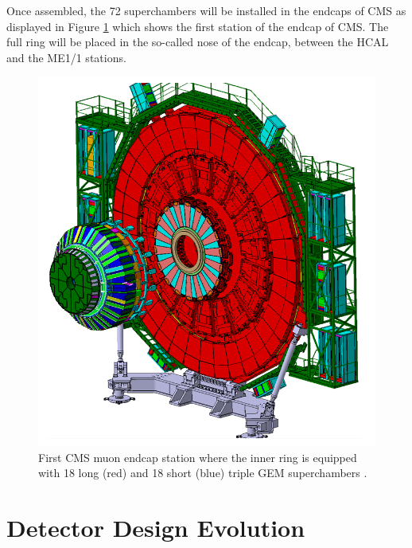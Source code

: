     Once assembled, the 72 superchambers will be installed in the endcaps of CMS as displayed in Figure \ref{fig:II-1-wheel} which shows the first station of the endcap of CMS. The full ring will be placed in the so-called nose of the endcap, between the HCAL and the ME1/1 stations.

    \begin{figure}[p]
      \centering
      \includegraphics[width=\textwidth]{img/II-1-gem/wheel.png}
      \caption{First CMS muon endcap station where the inner ring is equipped with 18 long (red) and 18 short (blue) triple GEM superchambers \cite{Colaleo:2021453}.}
      \label{fig:II-1-wheel}
    \end{figure}

  \section{Detector Design Evolution}

